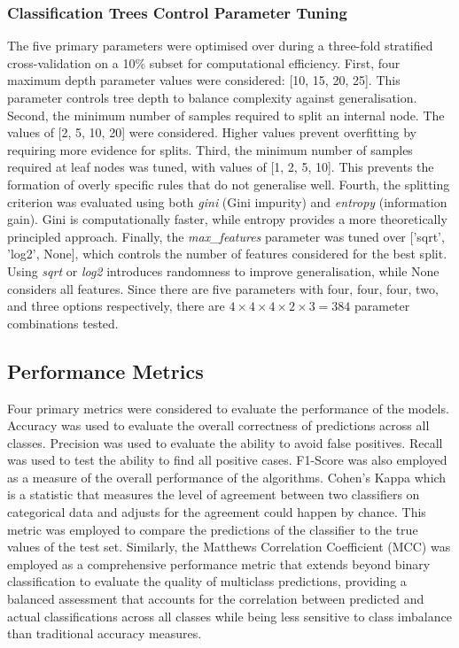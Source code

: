 \documentclass[10pt, conference]{IEEEtran}
\begin{document}
\subsubsection{Classification Trees Control Parameter Tuning}
The five primary parameters were optimised over during a three-fold stratified cross-validation on a 10\% subset for computational efficiency.  First, four maximum depth parameter values were considered: [10, 15, 20, 25]. This parameter controls tree depth to balance complexity against generalisation. Second, the minimum number of samples required to split an internal node. The values of [2, 5, 10, 20] were considered. Higher values prevent overfitting by requiring more evidence for splits. Third, the minimum number of samples required at leaf nodes was tuned, with values of [1, 2, 5, 10]. This prevents the formation of overly specific rules that do not generalise well. Fourth, the splitting criterion was evaluated using both \textit{gini} (Gini impurity) and \textit{entropy} (information gain). Gini is computationally faster, while entropy provides a more theoretically principled approach. Finally, the \textit{max\_features} parameter was tuned over ['sqrt', 'log2', None], which controls the number of features considered for the best split. Using \textit{sqrt} or \textit{log2} introduces randomness to improve generalisation, while None considers all features. Since there are five parameters with four, four, four, two, and three options respectively, there are $4 \times 4 \times 4 \times 2 \times 3 = 384$ parameter combinations tested. 


\subsection{Performance Metrics}
Four primary metrics were considered to evaluate the performance of the models. Accuracy was used to evaluate the overall correctness of predictions across all classes.  Precision was used to evaluate the ability to avoid false positives. Recall was used to test the ability to find all positive cases. F1-Score was also employed as a measure of the overall performance of the algorithms. Cohen's Kappa which is a statistic that measures the level of agreement between two classifiers on categorical data and adjusts for the agreement could happen by chance. This metric was employed to compare the predictions of the classifier to the true values of the test set. Similarly, the Matthews Correlation Coefficient (MCC) was employed as a comprehensive performance metric that extends beyond binary classification to evaluate the quality of multiclass predictions, providing a balanced assessment that accounts for the correlation between predicted and actual classifications across all classes while being less sensitive to class imbalance than traditional accuracy measures.
\end{document}
